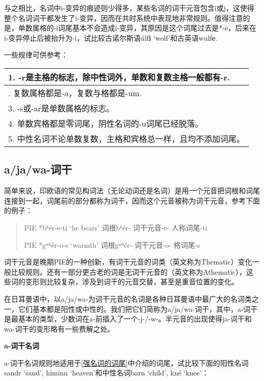 与之相比，名词中i-变异的痕迹则少得多，某些名词的词干元音包含i或j，这使得整个名词词干都发生了i-变异，因而在共时系统中表现地非常规则。值得注意的是，单数属格的-i词尾基本不会造成i-变异，其原因是这个词尾过去是*-ē，后来在i-变异停止后被抬升为-i，试比较古诺尔斯语úlf\textbf{i}
`wolf'和古英语wulf\textbf{e}.

一些规律可供参考：

\begin{longtable}{l}
  \toprule
  1. -r是主格的标志，除中性词外，单数和复数主格一般都有-r.    \\
  \midrule
  \endhead
  \bottomrule
  \endfoot
  2. 复数属格都是-a，复数与格都是-um.                         \\
  3. -s或-ar是单数属格的标志。                                \\
  4. 单数宾格都是零词尾，阴性名词的-u词尾已经脱落。           \\
  5. 中性名词不论单数复数，主格和宾格总一样，且均不添加词尾。 \\
\end{longtable}

\subsection{a/ja/wa-词干}\label{a/ja/wa-词干}

简单来说，印欧语的常见构词法（无论动词还是名词）是用一个元音把词根和词尾连接到一起，词尾前的部分都称为词干，因而这个元音被称为词干元音，参考下面的例子：

\begin{quote}
  PIE *bʰér-e-ti `he bears' 词根bʰér- 词干元音-e- 人称词尾-ti

  PIE *gʷʰér-o-s `warmth' 词根gʷʰér- 词干元音-o- 格词尾-s
\end{quote}

词干元音是晚期PIE的一种创新，有词干元音的词类（英文称为Thematic）变化一般比较规则。还有一部分更古老的词是无词干元音的（英文称为Athematic），这些词的变形则比较复杂，涉及到词干的元音交替，甚至是重音位置的变化。

在日耳曼语中，以a/ja/wa-为词干元音的名词是各种日耳曼语中最广大的名词类之一，它们基本都是阳性或中性的。我们把它们简称为a/ja/wa-词干，其中，a-词干是最基本的类型，少数词在a-前插入了一个-j-/-w-。半元音的出现使得ja-词干和wa-词干的变形略有一些费解之处。

\textbf{a-词干名词}

a-词干名词规则地适用于\ref{强名词的词尾}中介绍的词尾，试比较下面的阳性名词sandr
`sand', himinn `heaven'和中性名词barn `child', kné `knee'：

